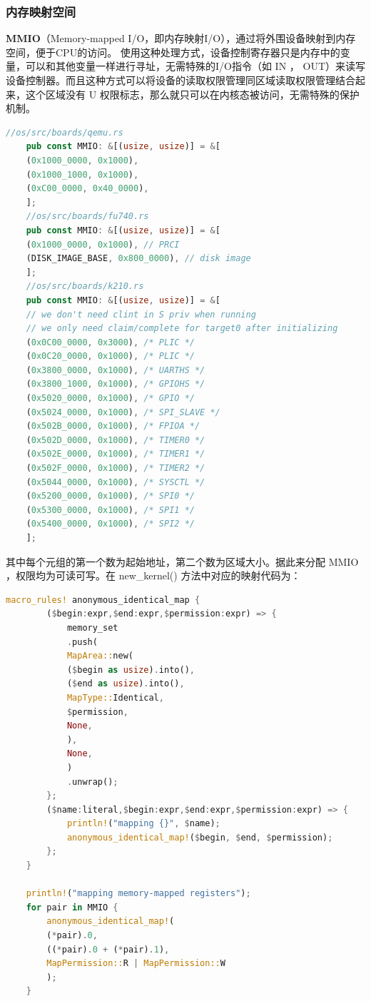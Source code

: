 \subsubsection{内存映射空间}

\textbf{MMIO}（Memory-mapped
I/O，即内存映射I/O），通过将外围设备映射到内存空间，便于CPU的访问。
使用这种处理方式，设备控制寄存器只是内存中的变量，可以和其他变量一样进行寻址，无需特殊的I/O指令（如 IN ， OUT）来读写设备控制器。而且这种⽅式可以将设备的读取权限管理同区域读取权限管理结合起来，这个区域没有 U 权限标志，那么就只可以在内核态被访问，无需特殊的保护机制。

\begin{lstlisting}[language={Rust}, caption={//os/board}]
	//os/src/boards/qemu.rs
	pub const MMIO: &[(usize, usize)] = &[
	(0x1000_0000, 0x1000),
	(0x1000_1000, 0x1000),
	(0xC00_0000, 0x40_0000),
	];
	//os/src/boards/fu740.rs
	pub const MMIO: &[(usize, usize)] = &[
	(0x1000_0000, 0x1000), // PRCI
	(DISK_IMAGE_BASE, 0x800_0000), // disk image
	];
	//os/src/boards/k210.rs
	pub const MMIO: &[(usize, usize)] = &[
	// we don't need clint in S priv when running
	// we only need claim/complete for target0 after initializing
	(0x0C00_0000, 0x3000), /* PLIC */
	(0x0C20_0000, 0x1000), /* PLIC */
	(0x3800_0000, 0x1000), /* UARTHS */
	(0x3800_1000, 0x1000), /* GPIOHS */
	(0x5020_0000, 0x1000), /* GPIO */
	(0x5024_0000, 0x1000), /* SPI_SLAVE */
	(0x502B_0000, 0x1000), /* FPIOA */
	(0x502D_0000, 0x1000), /* TIMER0 */
	(0x502E_0000, 0x1000), /* TIMER1 */
	(0x502F_0000, 0x1000), /* TIMER2 */
	(0x5044_0000, 0x1000), /* SYSCTL */
	(0x5200_0000, 0x1000), /* SPI0 */
	(0x5300_0000, 0x1000), /* SPI1 */
	(0x5400_0000, 0x1000), /* SPI2 */
	];
\end{lstlisting}
其中每个元组的第一个数为起始地址，第二个数为区域大小。据此来分配 MMIO
，权限均为可读可写。在 new\_kernel() 方法中对应的映射代码为：
\begin{lstlisting}[language={Rust},	caption={//os/mm/memory\_set.rs}]
	macro_rules! anonymous_identical_map {
		($begin:expr,$end:expr,$permission:expr) => {
			memory_set
			.push(
			MapArea::new(
			($begin as usize).into(),
			($end as usize).into(),
			MapType::Identical,
			$permission,
			None,
			),
			None,
			)
			.unwrap();
		};
		($name:literal,$begin:expr,$end:expr,$permission:expr) => {
			println!("mapping {}", $name);
			anonymous_identical_map!($begin, $end, $permission);
		};
	}   
	
	println!("mapping memory-mapped registers");
	for pair in MMIO {
		anonymous_identical_map!(
		(*pair).0,
		((*pair).0 + (*pair).1),
		MapPermission::R | MapPermission::W
		);
	}
\end{lstlisting}

